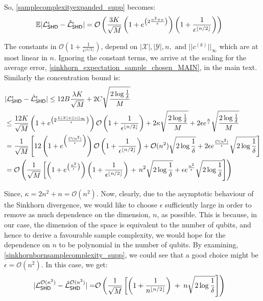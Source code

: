 So, \eqref{samplecomplexityexpanded_supp} becomes:
\begin{align}
     &\mathbb{E}|\mathcal{L}_{\operatorname{\textsf{SHD}}}^\epsilon - \hat{\mathcal{L}}_{\operatorname{\textsf{SHD}}}^\epsilon| = \mathcal{O}\left(\frac{3K}{\sqrt{M}}\left(1+e^{\left(2\frac{n^2+n}{\epsilon}\right)}\right)\left(1+\frac{1}{\epsilon^{\lfloor n/2\rfloor}}\right)\right)
\end{align}



\noindent The constants in $\mathcal{O}\left(1+\frac{1}{\epsilon^{\lfloor n/2\rfloor}}\right)$, depend on $|\mathcal{X}|, |\mathcal{Y}|, n, \text{ and } ||c^{(k)}||_\infty$ which are at most linear in $n$. Ignoring the constant terms, we arrive at the scaling for the average error, \eqref{sinkhorn_expectation_sample_chosen_MAIN}, in the main text. Similarly the concentration bound is: 
\begin{align}
    &|\mathcal{L}_{\operatorname{\textsf{SHD}}}^\epsilon - \hat{\mathcal{L}}_{\operatorname{\textsf{SHD}}}^\epsilon| \leq 12B\frac{\lambda K}{\sqrt{M}} + 2C\sqrt{\frac{2\log\frac{1}{\delta}}{M}}\\
    &\leq \frac{12K}{\sqrt{M}}\left(1+e^{\left(2\frac{L|\mathcal{X}|+||c||_{\infty}}{\epsilon}\right)}\right)\mathcal{O}\left(1+\frac{1}{\epsilon^{\lfloor n/2\rfloor}}\right)+ 2\kappa\sqrt{\frac{2\log\frac{1}{\delta}}{M}} + 2\epsilon e^{\frac{\kappa}{\epsilon}}\sqrt{\frac{2\log\frac{1}{\delta}}{M}}\\
    &= \frac{1}{\sqrt{M}}\left[12\left(1+e^{\left(\frac{\mathcal{O}(n^{2})}{\epsilon}\right)}\right)\mathcal{O}\left(1+\frac{1}{\epsilon^{\lfloor n/2\rfloor}}\right)+\mathcal{O}(n^{2})\sqrt{2\log\frac{1}{\delta}} + 2\epsilon e^{\frac{\mathcal{O}(n^{2})}{\epsilon}}\sqrt{2\log\frac{1}{\delta}}\right]\\
    &= \mathcal{O}\left(\frac{1}{\sqrt{M}}\left[\left(1+e^{\left(\frac{n^{2}}{\epsilon}\right)}\right)\left(1+\frac{1}{\epsilon^{\lfloor n/2\rfloor}}\right)\right.+ \left.n^{2}\sqrt{2\log\frac{1}{\delta}}  + \epsilon e^{\frac{n^{2}}{\epsilon}}\sqrt{2\log\frac{1}{\delta}}\right]\right) \label{sinkhornbornsamplecomplexity_supp}
\end{align}


Since, $\kappa = 2n^2+n = \mathcal{O}(n^{2})$. Now, clearly, due to the asymptotic behaviour of the Sinkhorn divergence, we would like to choose $\epsilon$ sufficiently large in order to remove as much dependence on the dimension, $n$, as possible. This is because, in our case, the dimension of the space is equivalent to the number of qubits, and hence to derive a favourable sample complexity, we would hope for the dependence on $n$ to be polynomial in the number of qubits. By examining, \eqref{sinkhornbornsamplecomplexity_supp}, we could see that a good choice might be $\epsilon = \mathcal{O}(n^{2})$. In this case, we get:
\begin{align}
    |\mathcal{L}_{\operatorname{\textsf{SHD}}}^{\mathcal{O}(n^{2})} - \hat{\mathcal{L}}_{\operatorname{\textsf{SHD}}}^{\mathcal{O}(n^{2})}| 
    = &\mathcal{O}\left(\frac{1}{\sqrt{M}}\left[\left(1+\frac{1}{n^{\lfloor n/2\rfloor}}\right)\right.\right.+ \left.\left.n\sqrt{2\log\frac{1}{\delta}}\right]\right) \label{sinkhornbornsamplecomplexitychoosed_supp}
\end{align}


